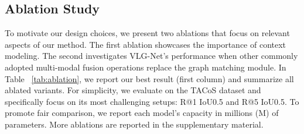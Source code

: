 \documentclass[10pt,twocolumn,letterpaper]{article}
\begin{document}
\begin{table}[!t]
    \centering \setlength{\tabcolsep}{3pt}
\renewcommand{\arraystretch}{1} 
\vspace{.1cm}
\caption{\label{tab:anet}{\bf State-of-the-art comparison on ActivityNet Captions.} We report the results at different Recall@ and different IoU thresholds. VLG-Net reaches the highest scores for IoU0.7 for both R@1 and R@5. 
}
\label{anet_results}


     \vspace{-0.2cm}
\end{table}


\subsection{Ablation Study} \label{subsec: Abl}
To motivate our design choices, we present two ablations that focus on relevant aspects of our method. The first ablation showcases the importance of context modeling. The second investigates VLG-Net's performance when other commonly adopted multi-modal fusion operations replace the graph matching module. In Table ~\ref{tab:ablation}, we report our best result (first column) and summarize all ablated variants. For simplicity, we evaluate on the TACoS dataset and specifically focus on its most challenging setups: R@1 IoU0.5 and R@5 IoU0.5. To promote fair comparison, we report each model's capacity in millions (M) of parameters. More ablations are reported in the supplementary material. 
\end{document}
